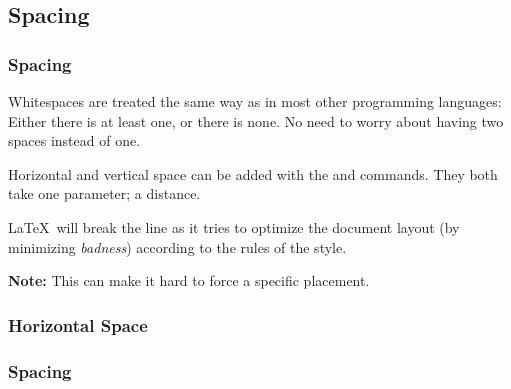 \subsection{Spacing}
\begin{frame}[fragile]
  \frametitle{Spacing}
  \vspace{3mm}
  Whitespaces are treated the same way as in most other programming languages: Either there is at least one, or there is none. No need to worry about having two spaces instead of one.
  
  \vspace{5mm}
  Horizontal and vertical space can be added with the  and  commands. They both take one parameter; a distance.
  
  \vspace{5mm}
  \LaTeX\ will break the line as it tries to optimize the document layout (by minimizing \textsl{badness}) according to the rules of the style.
  
  \vspace{5mm}
  \textbf{Note:} This can make it hard to force a specific placement.
\end{frame}

\subsubsection{Horizontal Space}
\begin{frame}[fragile]
  \frametitle{Spacing }
  \vspace{3mm}
\end{frame}

